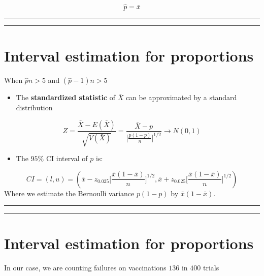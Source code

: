 \documentclass[
]{book}
\providecommand{\tightlist}{%
  \setlength{\itemsep}{0pt}\setlength{\parskip}{0pt}}
\begin{document}
\[\hat{p}=\bar{x}\]

\begin{center}\rule{0.5\linewidth}{0.5pt}\end{center}

\begin{center}\rule{0.5\linewidth}{0.5pt}\end{center}

\hypertarget{interval-estimation-for-proportions-2}{%
\section{Interval estimation for proportions}\label{interval-estimation-for-proportions-2}}

When \(\hat{p}n>5\) and \((\hat{p}-1)n>5\)

\begin{itemize}
\tightlist
\item
  The \textbf{standardized statistic} of \(\bar{X}\) can be approximated by a standard distribution
\end{itemize}

\[Z=\frac{\bar{X}-E(\bar{X})}{\sqrt{V(\bar{X})}}= \frac{\bar{X}-p}{\big[\frac{p(1-p)}{n} \big]^{1/2}}\rightarrow N(0,1)\]

\begin{itemize}
\tightlist
\item
  The \(95\%\) CI interval of \(p\) is:
\end{itemize}

\[CI=(l,u)=(\bar{x}-z_{0.025}\big[\frac{\bar{x}(1-\bar{x})}{n} \big]^{1/2},  \bar{x}+z_{0.025}\big[\frac{\bar{x}(1-\bar{x})}{n} \big]^{1/2})\]
Where we estimate the Bernoulli variance \(p(1-p)\) by \(\bar{x}(1-\bar{x})\).

\begin{center}\rule{0.5\linewidth}{0.5pt}\end{center}

\begin{center}\rule{0.5\linewidth}{0.5pt}\end{center}

\hypertarget{interval-estimation-for-proportions-3}{%
\section{Interval estimation for proportions}\label{interval-estimation-for-proportions-3}}

In our case, we are counting failures on vaccinations \(136\) in \(400\) trials
\end{document}

